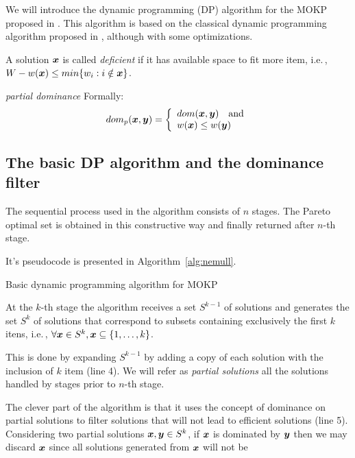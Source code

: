 

We will introduce the dynamic programming (DP) algorithm for the MOKP proposed in \cite{bazgan2009}.
This algorithm is based on the classical dynamic programming algorithm proposed in \cite{nemhauser1969discrete},
although with some optimizations.

A solution $\boldsymbol{x}$ is called \emph{deficient} if it has available space
to fit more item, i.e.\,, $W - w(\boldsymbol{x}) \leq min\{ w_i : i \notin \boldsymbol{x} \}$.

\emph{partial dominance} Formally:
\begin{displaymath}
    dom_p(\boldsymbol{x}, \boldsymbol{y}) = \left\{
      \begin{array}{l}
          dom(\boldsymbol{x}, \boldsymbol{y}) \quad \text{and}\\
          w(\boldsymbol{x}) \leq w(\boldsymbol{y})
  \end{array} \right.
\end{displaymath}

\subsection{The basic DP algorithm and the dominance filter}
The sequential process used in the algorithm consists of $n$ stages.
The Pareto optimal set is obtained in this constructive way and finally returned after
$n$-th stage.

It's pseudocode is presented in Algorithm~\ref{alg:nemull}.
\begin{algorithm}
  \caption{Basic dynamic programming algorithm for MOKP}
  \label{alg:nemull}
  
\end{algorithm}
At the $k$-th stage the algorithm receives a set $S^{k-1}$ of solutions and
generates the set $S^k$ of solutions that correspond
to subsets containing exclusively the first $k$ itens, i.e.\,,
$\forall\boldsymbol{x} \in S^k, \boldsymbol{x} \subseteq \{1, \ldots, k\}$.

This is done by expanding $S^{k-1}$ by adding a copy of each solution with the
inclusion of $k$ item (line 4).
We will refer as \emph{partial solutions} all the solutions handled by 
stages prior to $n$-th stage.

The clever part of the algorithm is that it uses the concept of dominance
on partial solutions to filter solutions that will not lead to efficient solutions (line 5).
Considering two partial solutions $\boldsymbol{x}, \boldsymbol{y} \in S^k$, if
$\boldsymbol{x}$ is dominated by $\boldsymbol{y}$ then we may discard $\boldsymbol{x}$ since all
solutions generated from $\boldsymbol{x}$ will not be 

